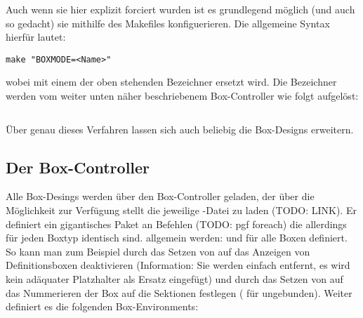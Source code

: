 Auch wenn sie hier explizit forciert wurden ist es grundlegend möglich (und auch so gedacht) sie mithilfe des Makefiles konfiguerieren. Die allgemeine Syntax hierfür lautet:
\begin{lstlisting}[language=lBash]
make "BOXMODE=<Name>"
\end{lstlisting}
wobei  mit einem der oben stehenden Bezeichner ersetzt wird. Die Bezeichner werden vom weiter unten näher beschriebenem Box-Controller wie folgt aufgelöst:
\begin{lstlisting}[language=lLatex,frame=none]

\end{lstlisting}
Über genau dieses Verfahren lassen sich auch beliebig die Box-Designs erweitern.
\subsection{Der Box-Controller}
{\centering {}\vspace*{0.5\baselineskip}\par}\reversemarginpar
Alle Box-Desings werden über den Box-Controller geladen, der über  die Möglichkeit zur Verfügung stellt die jeweilige -Datei zu laden (TODO: LINK). Er definiert ein gigantisches Paket an Befehlen (TODO: pgf foreach) die allerdings für jeden Boxtyp identisch sind. allgemein werden:  und  für alle Boxen definiert. So kann man zum Beispiel durch das Setzen von  auf  das Anzeigen von Definitionsboxen deaktivieren (Information: Sie werden einfach entfernt, es wird kein adäquater Platzhalter als Ersatz eingefügt) und durch das Setzen von  auf das Nummerieren der Box auf die Sektionen festlegen ( für ungebunden).
Weiter definiert es die folgenden Box-Environments:
%

